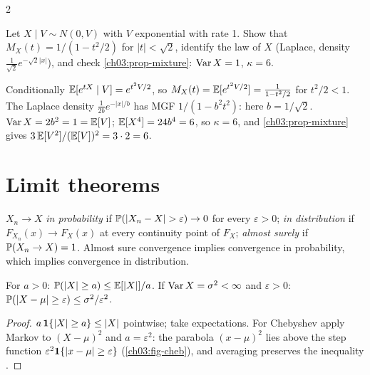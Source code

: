 \begin{paracol}{2}
\begin{exercise}\label{ch03:ex-laplace}
Let $X\mid V\sim N(0,V)$ with $V$ exponential with rate 1. Show that $M_X(t)=1/(1-t^2/2)$ for $|t|<\sqrt2$, identify the law of
$X$ (Laplace, density $\frac1{\sqrt2}e^{-\sqrt2|x|}$), and check \cref{ch03:prop-mixture}: $\operatorname{Var} X=1$, $\kappa=6$.
\end{exercise}
\begin{solution}[ch03:ex-laplace]
Conditionally $\mathbb{E}[e^{tX}\mid V]=e^{t^2V/2}$, so $M_X(t)=\mathbb{E}[e^{t^2V/2}]=\frac1{1-t^2/2}$ for $t^2/2<1$. The Laplace density
$\frac{1}{2b}e^{-|x|/b}$ has MGF $1/(1-b^2t^2)$: here $b=1/\sqrt2$. $\operatorname{Var} X=2b^2=1=\mathbb{E}[V]$; $\mathbb{E}[X^4]=24b^4=6$, so $\kappa=6$, and
\cref{ch03:prop-mixture} gives $3\,\mathbb{E}[V^2]/(\mathbb{E}[V])^2=3\cdot2=6$.
\end{solution}

\section{Limit theorems}\label{ch03:sec-limits}

\begin{definition}
$X_n\to X$ \emph{in probability} if $\Prob(|X_n-X|>\varepsilon)\to0$ for every $\varepsilon>0$; \emph{in distribution} if
$F_{X_n}(x)\to F_X(x)$ at every continuity point of $F_X$; \emph{almost surely} if $\mathbb{P}(X_n\to X)=1$. Almost sure
convergence implies convergence in probability, which implies convergence in distribution.
\end{definition}

\begin{lemma}\label{ch03:lem-cheb}
For $a>0$: $\mathbb{P}(|X|\ge a)\le\mathbb{E}[|X|]/a$. If $\operatorname{Var} X=\sigma^2<\infty$ and $\varepsilon>0$:
$\mathbb{P}(|X-\mu|\ge\varepsilon)\le\sigma^2/\varepsilon^2$.
\end{lemma}
\begin{proof}
$a\,\mathbf{1}\{|X|\ge a\}\le|X|$ pointwise; take expectations. For Chebyshev apply Markov to $(X-\mu)^2$ and $a=\varepsilon^2$: the
parabola $(x-\mu)^2$ lies above the step function $\varepsilon^2\mathbf{1}\{|x-\mu|\ge\varepsilon\}$ (\cref{ch03:fig-cheb}), and averaging
preserves the inequality .
\end{proof}


\end{paracol}

